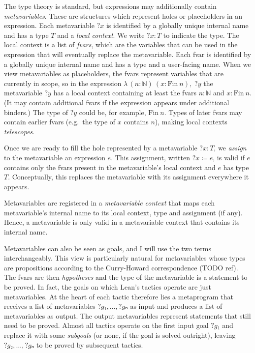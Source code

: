 \documentclass[sigplan,10pt,anonymous,review]{acmart}
\newcommand{\Lam}[2]{λ\,#1,\; #2}
\newcommand{\mvar}[1]{{?#1}}
\begin{document}
The type theory is standard, but expressions may additionally contain \emph{metavariables}.
These are structures which represent holes or placeholders in an expression.
Each metavariable $\mvar{x}$ is identified by a globally unique internal name and has a type $T$ and a \emph{local context}.
We write $\mvar{x} : T$ to indicate the type.
The local context is a list of \emph{fvars}, which are the variables that can be used in the expression that will eventually replace the metavariable.
Each fvar is identified by a globally unique internal name and has a type and a user-facing name.
When we view metavariables as placeholders, the fvars represent variables that are currently in scope, so in the expression $\Lam{(n : ℕ)~(x : \mathrm{Fin}~n)}{\mvar{y}}$ the metavariable $\mvar{y}$ has a local context containing at least the fvars $n : ℕ$ and $x : \mathrm{Fin}~n$.
(It may contain additional fvars if the expression appears under additional binders.)
The type of $\mvar{y}$ could be, for example, $\mathrm{Fin}~n$.
Types of later fvars may contain earlier fvars (e.g.\ the type of $x$ contains $n$), making local contexts \emph{telescopes}.

Once we are ready to fill the hole represented by a metavariable $\mvar{x} : T$, we \emph{assign} to the metavariable an expression $e$.
This assignment, written $\mvar{x} ≔ e$, is valid if $e$ contains only the fvars present in the metavariable's local context and $e$ has type $T$.
Conceptually, this replaces the metavariable with its assignment everywhere it appears.

Metavariables are registered in a \emph{metavariable context} that maps each metavariable's internal name to its local context, type and assignment (if any).
Hence, a metavariable is only valid in a metavariable context that contains its internal name.

Metavariables can also be seen as goals, and I will use the two terms interchangeably.
This view is particularly natural for metavariables whose types are propositions according to the Curry-Howard correspondence (TODO ref).
The fvars are then \emph{hypotheses} and the type of the metavariable is a statement to be proved.
In fact, the goals on which Lean's tactics operate are just metavariables.
At the heart of each tactic therefore lies a metaprogram that receives a list of metavariables $\mvar{g₁}, \dots, \mvar{gₙ}$ as input and produces a list of metavariables as output.
The output metavariables represent statements that still need to be proved.
Almost all tactics operate on the first input goal $\mvar{g₁}$ and replace it with some \emph{subgoals} (or none, if the goal is solved outright), leaving $\mvar{g₂}, \dots, \mvar{gₙ}$ to be proved by subsequent tactics.
\end{document}
